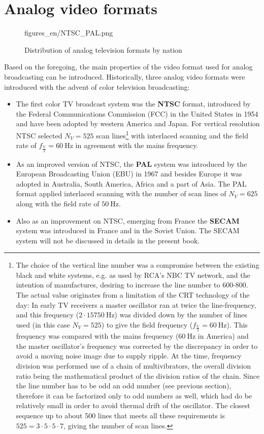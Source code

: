 \section{Analog video formats}

\begin{figure}[]
	\centering
	\begin{overpic}[width = 0.8\columnwidth ]{figures_en/NTSC_PAL.png}
	\end{overpic}
	\caption{Distribution of analog television formats by nation}
	\label{Fig:NTSC_map}
\end{figure}

Based on the foregoing, the main properties of the video format used for analog broadcasting can be introduced.
Historically, three analog video formats were introduced with the advent of color television broadcasting:
\begin{itemize}
\item The first color TV broadcast system was the \textbf{NTSC} format, introduced by the Federal Communications Commission (FCC) in the United States in 1954 and have been adopted by western America and Japan.
For vertical resolution NTSC selected $N_V = 525$ scan lines\footnote{
The choice of the vertical line number was a compromise between the existing black and white systems, e.g. as used by RCA's NBC TV network, and the intention of manufactures, desiring to increase the line number to 600-800.
The actual value originates from a limitation of the CRT technology of the day:
In early TV receivers a master oscillator ran at twice the line-frequency, and this frequency ($2\cdot 15750~\mathrm{Hz}$) was divided down by the number of lines used (in this case $N_V = 525$) to give the field frequency ($f_{\frac{\mathrm{V}}{2}} = 60~\mathrm{Hz}$).
This frequency was compared with the mains frequency ($60~\mathrm{Hz}$ in America) and the master oscillator's frequency was corrected by the discrepancy in order to avoid a moving noise image due to supply ripple.
At the time, frequency division was performed use of a chain of multivibrators, the overall division ratio being the mathematical product of the division ratios of the chain.
Since the line number has to be odd an odd number (see previous section), therefore it can be factorized only to odd numbers as well, which had do be relatively small in order to avoid thermal drift of the oscillator.
The closest sequence up to about 500 lines that meets all these requirements is $525 = 3\cdot 5\cdot 5 \cdot 7$, giving the number of scan lines.}
with interlaced scanning and the	 field rate of $f_{\mathrm{\frac{V}{2}}} = 60~\mathrm{Hz}$ in agreement with the mains frequency.
\item As an improved version of NTSC, the \textbf{PAL} system was introduced by the European Broadcasting Union (EBU) in 1967 and besides Europe it was adopted in Australia, South America, Africa and a part of Asia.
The PAL format applied interlaced scanning with the number of scan lines of $N_V = 625$ along with the field rate of $50~\mathrm{Hz}$.
\item Also as an improvement on NTSC, emerging from France the \textbf{SECAM} system was introduced in France and in the Soviet Union.
The SECAM system will not be discussed in details in the present book.
\end{itemize}
